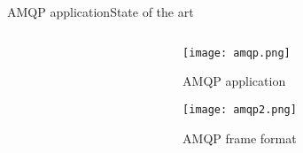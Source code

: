 \begin{frame}{AMQP application}{State of the art}
\begin{columns}
\begin{column}{0.6\textwidth}
		\end{column}
		
		\begin{column}{0.4\textwidth}
			\begin{center}
			
				\begin{figure}
					\texttt{[image: amqp.png]}
					\caption{\label{fig:amqp} AMQP application}
				\end{figure}
				
				\begin{figure}
					\texttt{[image: amqp2.png]}
					\caption{\label{fig:amqp2} AMQP frame format}
				\end{figure}
				
			\end{center}
		\end{column}
	\end{columns}
	
\end{frame}



